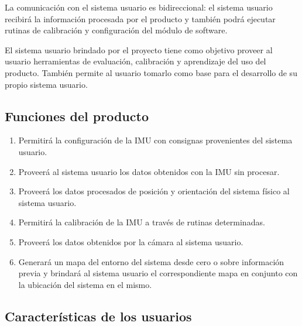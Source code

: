 \documentclass[12pt,a4paper, twosite]{article}
\begin{document}
La comunicación con el sistema usuario es bidireccional: el sistema usuario recibirá la información
procesada por el producto y también podrá ejecutar rutinas de calibración y configuración del
módulo de software.

El sistema usuario brindado por el proyecto tiene como objetivo proveer al usuario herramientas de
evaluación, calibración y aprendizaje del uso del producto. También permite al usuario tomarlo
como base para el desarrollo de su propio sistema usuario.

\subsection{Funciones del producto}
\label{sec:orgaf51da6}



\begin{enumerate}
  \item Permitirá la configuración de la IMU con consignas provenientes del sistema usuario.
  \item Proveerá al sistema usuario los datos obtenidos con la IMU sin procesar.
  \item Proveerá los datos procesados de posición y orientación del sistema físico al sistema
  usuario.
  \item Permitirá la calibración de la IMU a través de rutinas determinadas.
  \item Proveerá los datos obtenidos por la cámara al sistema usuario.
  \item Generará un mapa del entorno del sistema desde cero o sobre información previa y brindará
  al sistema usuario el correspondiente mapa en conjunto con la ubicación del sistema en el mismo.
\end{enumerate}

\subsection{Características de los usuarios}
\label{sec:orga40b0ee}
\end{document}
